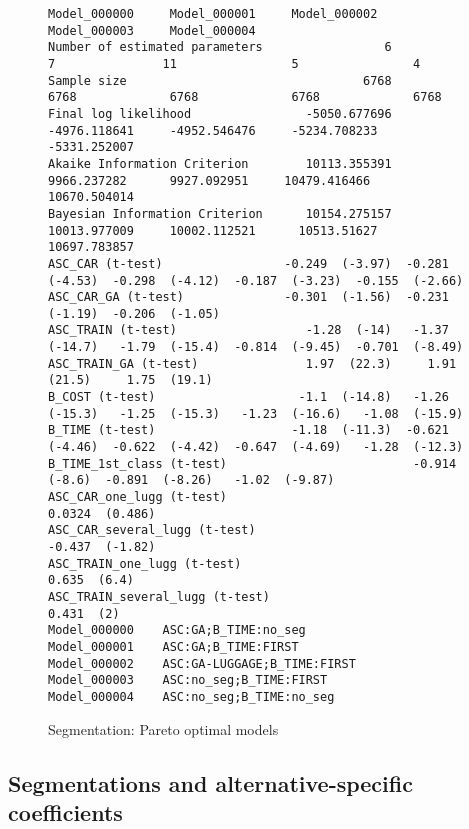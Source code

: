 \documentclass[12pt,a4paper]{article}
\begin{document}
\begin{landscape}
  \begin{figure}[p]
    \begin{lstlisting}[basicstyle=\scriptsize]
                                    Model_000000     Model_000001     Model_000002     Model_000003     Model_000004
Number of estimated parameters                 6                7               11                5                4
Sample size                                 6768             6768             6768             6768             6768
Final log likelihood                -5050.677696     -4976.118641     -4952.546476     -5234.708233     -5331.252007
Akaike Information Criterion        10113.355391      9966.237282      9927.092951     10479.416466     10670.504014
Bayesian Information Criterion      10154.275157     10013.977009     10002.112521      10513.51627     10697.783857
ASC_CAR (t-test)                 -0.249  (-3.97)  -0.281  (-4.53)  -0.298  (-4.12)  -0.187  (-3.23)  -0.155  (-2.66)
ASC_CAR_GA (t-test)              -0.301  (-1.56)  -0.231  (-1.19)  -0.206  (-1.05)
ASC_TRAIN (t-test)                  -1.28  (-14)   -1.37  (-14.7)   -1.79  (-15.4)  -0.814  (-9.45)  -0.701  (-8.49)
ASC_TRAIN_GA (t-test)               1.97  (22.3)     1.91  (21.5)     1.75  (19.1)
B_COST (t-test)                    -1.1  (-14.8)   -1.26  (-15.3)   -1.25  (-15.3)   -1.23  (-16.6)   -1.08  (-15.9)
B_TIME (t-test)                   -1.18  (-11.3)  -0.621  (-4.46)  -0.622  (-4.42)  -0.647  (-4.69)   -1.28  (-12.3)
B_TIME_1st_class (t-test)                          -0.914  (-8.6)  -0.891  (-8.26)   -1.02  (-9.87)
ASC_CAR_one_lugg (t-test)                                          0.0324  (0.486)
ASC_CAR_several_lugg (t-test)                                      -0.437  (-1.82)
ASC_TRAIN_one_lugg (t-test)                                           0.635  (6.4)
ASC_TRAIN_several_lugg (t-test)                                         0.431  (2)
Model_000000	ASC:GA;B_TIME:no_seg
Model_000001	ASC:GA;B_TIME:FIRST
Model_000002	ASC:GA-LUGGAGE;B_TIME:FIRST
Model_000003	ASC:no_seg;B_TIME:FIRST
Model_000004	ASC:no_seg;B_TIME:no_seg
\end{lstlisting}
\caption{\label{fig:b04segmentation}Segmentation: Pareto optimal models}
  \end{figure}
\end{landscape}

\subsection{Segmentations and alternative-specific coefficients}
\end{document}
